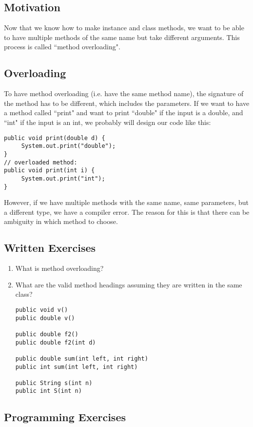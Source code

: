 
\subsection{Motivation}
Now that we know how to make instance and class methods, we want to be able to have multiple methods of the same name but take different arguments. This process is called ``method overloading".

\subsection{Overloading}
To have method overloading (i.e. have the same method name), the signature of the method has to be different, which includes the parameters. If we want to have a method called ``print" and want to print ``double" if the input is a double, and ``int" if the input is an int, we probably will design our code like this:
\begin{lstlisting}
public void print(double d) {
     System.out.print("double");
}
// overloaded method:
public void print(int i) {
     System.out.print("int");
}
\end{lstlisting}
However, if we have multiple methods with the same name, same parameters, but a different type, we have a compiler error. The reason for this is that there can be ambiguity in which method to choose.

\subsection{Written Exercises}

\setcounter{counter}{1}
\begin{enumerate}[label={\arabic{counter}\addtocounter{counter}{1}}.]

\item What is method overloading? 

\item What are the valid method headings assuming they are written in the same class?
\begin{lstlisting}
public void v()
public double v()

public double f2()
public double f2(int d)

public double sum(int left, int right)
public int sum(int left, int right)

public String s(int n)
public int S(int n)
\end{lstlisting}

\end{enumerate}

\subsection{Programming Exercises}